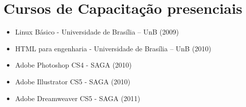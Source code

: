 \section{Cursos de Capacitação presenciais}
\begin{itemize}
    \item Linux Básico - Universidade de Brasília – UnB (2009)
    \item HTML para engenharia - Universidade de Brasília – UnB (2010)
    \item Adobe Photoshop CS4 - SAGA (2010)
    \item Adobe Illustrator CS5 - SAGA (2010)
    \item Adobe Dreamweaver CS5 - SAGA (2011)
\end{itemize}